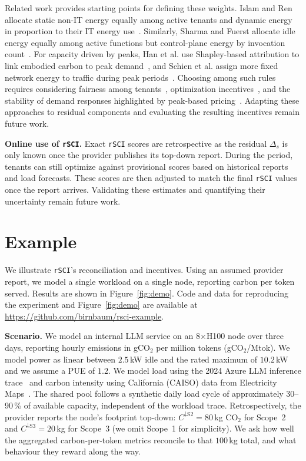 \documentclass[sigconf]{acmart}
\newcommand{\parag}[1]{\vspace{2mm}\noindent\textbf{#1.}\hspace{2mm}}
\newcommand{\RSCI}{\texttt{rSCI}\xspace}
\begin{document}
Related work provides starting points for defining these weights.
Islam and Ren allocate static non-IT energy equally among active tenants and dynamic energy in proportion to their IT energy use~\cite{islam2016energyaccounting}.
Similarly, Sharma and Fuerst allocate idle energy equally among active functions but control-plane energy by invocation count~\cite{sharma2024accountable_footprint_serverless,sharma2025disaggregation}.
For capacity driven by peaks, Han et al. use Shapley-based attribution to link embodied carbon to peak demand~\cite{han2024gametheoretic,han2025fairco2}, and Schien et al. assign more fixed network energy to traffic during peak periods~\cite{schien2025causal}.
Choosing among such rules requires considering fairness among tenants~\cite{westerhof2023allocation,montoyafranco2025fairwatt}, optimization incentives~\cite{li2025llmserving}, and the stability of demand responses highlighted by peak-based pricing~\cite{nasiriani2016peakpricing}.
Adapting these approaches to residual components and evaluating the resulting incentives remain future work.

\parag{Online use of \RSCI}
Exact \RSCI scores are retrospective as the residual $\Delta_s$ is only known once the provider publishes its top-down report.
During the period, tenants can still optimize against provisional scores based on historical reports and load forecasts.
These scores are then adjusted to match the final \RSCI values once the report arrives.
Validating these estimates and quantifying their uncertainty remain future work.

\section{Example}
\label{sec:demo}

We illustrate \RSCI's reconciliation and incentives.
Using an assumed provider report, we model a single workload on a single node, reporting carbon per token served. Results are shown in Figure~\ref{fig:demo}.
Code and data for reproducing the experiment and Figure~\ref{fig:demo} are available at \url{https://github.com/birnbaum/rsci-example}.

\parag{Scenario}
We model an internal LLM service on an 8$\times$H100 node over three days, reporting hourly emissions in gCO$_2$ per million tokens (gCO$_2$/Mtok).
We model power as linear between $2.5$\,kW idle and the rated maximum of $10.2$\,kW~\cite{nvidia-dgx-h100-datasheet} and we assume a PUE of $1.2$.
We model load using the 2024 Azure LLM inference trace~\cite{stojkovic2025dynamollm} and carbon intensity using California (CAISO) data from Electricity Maps~\cite{electricitymaps2026}.
The shared pool follows a synthetic daily load cycle of approximately 30--90\,\% of available capacity, independent of the workload trace.
Retrospectively, the provider reports the node's footprint top-down: $C^{\downarrow\text{S2}}\!=\!80$\,kg CO$_2$ for Scope~2 and $C^{\downarrow\text{S3}}\!=\!20$\,kg for Scope~3 (we omit Scope~1 for simplicity).
We ask how well the aggregated carbon-per-token metrics reconcile to that $100$\,kg total, and what behaviour they reward along the way.
\end{document}
